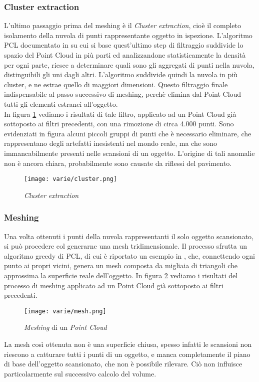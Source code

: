 \subsubsection{Cluster extraction}
L'ultimo passaggio prima del meshing è il \emph{Cluster extraction}, cioè il completo isolamento della nuvola di punti rappresentante oggetto in ispezione.
L'algoritmo PCL documentato in \cite{site:cluster} su cui si base quest'ultimo step di filtraggio suddivide lo spazio del Point Cloud in più parti ed analizzandone statisticamente la densità per ogni parte, riesce a determinare quali sono  gli aggregati di punti nella nuvola, distinguibili gli uni dagli altri.
L'algoritmo suddivide quindi la nuvola in più cluster, e ne estrae quello di maggiori dimensioni. Questo filtraggio finale indispensabile al passo successivo di meshing, perchè elimina dal Point Cloud tutti gli elementi estranei all'oggetto.\\
In figura \ref{fig:cluster} vediamo i risultati di tale filtro, applicato ad un Point Cloud già sottoposto ai filtri precedenti, con una rimozione di circa 4.000 punti. Sono evidenziati in figura alcuni piccoli gruppi di punti che è necessario eliminare, che rappresentano degli artefatti inesistenti nel mondo reale, ma che sono immancabilmente presenti nelle scansioni di un oggetto. L'origine di tali anomalie non è ancora chiara, probabilmente sono causate da riflessi del pavimento.
\begin{figure}[!h] 
    \centering 
    \texttt{[image: varie/cluster.png]} 
    \caption{\emph{Cluster extraction}}
    \label{fig:cluster}
\end{figure}

\subsubsection{Meshing}
Una volta ottenuti i punti della nuvola rappresentanti il solo oggetto scansionato, si può procedere col generarne una mesh tridimensionale.
Il processo sfrutta un algoritmo greedy di PCL, di cui è riportato un esempio in \cite{site:meshing}, che, connettendo ogni punto ai propri vicini, genera un mesh composta da migliaia di triangoli che approssima la superficie reale dell'oggetto.
In figura \ref{fig:mesh} vediamo i risultati del processo di meshing applicato ad un Point Cloud già sottoposto ai filtri precedenti.
\begin{figure}[!h] 
    \centering 
    \texttt{[image: varie/mesh.png]} 
    \caption{\emph{Meshing} di un \emph{Point Cloud}}
    \label{fig:mesh}
\end{figure}
\newline
La mesh così ottenuta non è una superficie chiusa, spesso infatti le scansioni non riescono a catturare tutti i punti di un oggetto, e manca completamente il piano di base dell'oggetto scansionato, che non è possibile rilevare. Ciò non influisce particolarmente sul successivo calcolo del volume.

